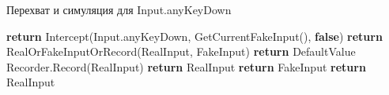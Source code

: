 \begin{algorithm}
	\caption{Перехват и симуляция для Input.anyKeyDown}\label{alg:input}
	\begin{algorithmic}
		\State \textbf{return} Intercept(Input.anyKeyDown, 
		\State GetCurrentFakeInput(), 
		\State \textbf{false})
		\EndProcedure
		\State \textbf{return} RealOrFakeInputOrRecord(RealInput, FakeInput)
		\Else
		\State \textbf{return} DefaultValue
		\EndIf
		\EndProcedure
		\State Recorder.Record(RealInput)
		\State \textbf{return} RealInput
		\State \textbf{return} FakeInput
		\Else
		\State \textbf{return} RealInput
		\EndIf
		\EndProcedure
	\end{algorithmic}
\end{algorithm}